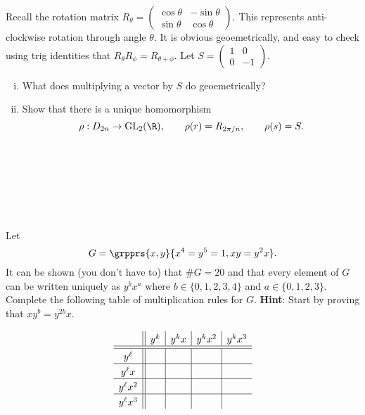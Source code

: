 \documentclass[a4paper]{article}
\begin{document}
\begin{questionbody}
Recall the rotation matrix $R_\theta = \begin{pmatrix} \cos \theta & -\sin \theta \\ \sin \theta & \cos \theta \end{pmatrix}$. This represents anti-clockwise rotation through angle $\theta$. It is obvious geoemetrically, and easy to check using trig identities that $R_\theta R_\phi = R_{\theta + \phi}$. Let $S = \begin{pmatrix} 1 & 0 \\ 0 & -1 \end{pmatrix}$.
\begin{enumerate}[(i)]
\item What does multiplying a vector by $S$ do geoemetrically?

\item Show that there is a unique homomorphism \[ \rho : D_{2n} \to \mathrm{GL}_2(\R), \qquad \rho(r) = R_{2\pi/n}, \qquad \rho(s) = S. \]
\end{enumerate}
\end{questionbody}

\subsection{~} %
\subsection{~} %



\begin{questionbody}
Let \[
G = \grpprs{x, y}{x^4 = y^5 = 1, xy = y^2x}.
\] It can be shown (you don't have to) that $\# G = 20$ and that every element of $G$ can be written uniquely as $y^b x^a$ where $b \in \{0,1,2,3,4\}$ and $a \in \{0,1,2,3\}$. Complete the following table of multiplication rules for $G$. \textbf{Hint}: Start by proving that $xy^b = y^{2b}x$.

\[
\setlength{\extrarowheight}{3pt}%
\begin{array}{c||*{3}{c|}c} %
    & y^k & y^k x & y^k x^2 & y^k x^3 \\
\hline \hline %
y^\ell &&&& \\
\hline %
y^\ell x &&&& \\
\hline %
y^\ell x^2 &&&& \\
\hline %
y^\ell x^3 &&&& \\
\end{array}
\]
\end{questionbody}
\end{document}
